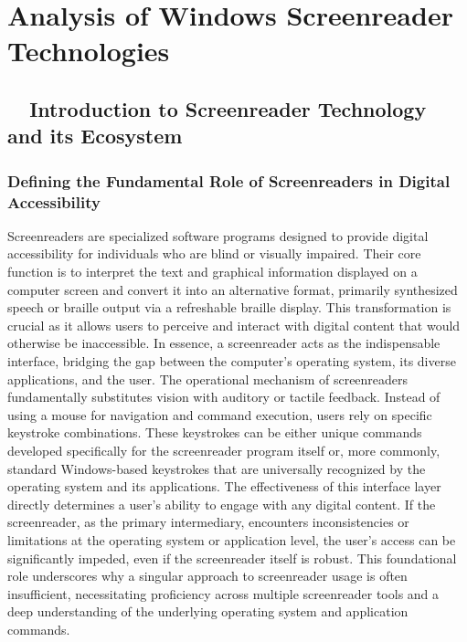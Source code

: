 \chapter{Analysis of Windows Screenreader Technologies}

\section{~~Introduction to Screenreader Technology and its Ecosystem}

\subsection{Defining the Fundamental Role of Screenreaders in Digital Accessibility}
Screenreaders are specialized software programs designed to provide digital accessibility for individuals who are blind or visually impaired. Their core function is to interpret the text and graphical information displayed on a computer screen and convert it into an alternative format, primarily synthesized speech or braille output via a refreshable braille display.\supercite{kingsbury2025} This transformation is crucial as it allows users to perceive and interact with digital content that would otherwise be inaccessible. In essence, a screenreader acts as the indispensable interface, bridging the gap between the computer's operating system, its diverse applications, and the user.\supercite{kingsbury2025}
The operational mechanism of screenreaders fundamentally substitutes vision with auditory or tactile feedback. Instead of using a mouse for navigation and command execution, users rely on specific keystroke combinations. These keystrokes can be either unique commands developed specifically for the screenreader program itself or, more commonly, standard Windows-based keystrokes that are universally recognized by the operating system and its applications.\supercite{kingsbury2025} The effectiveness of this interface layer directly determines a user's ability to engage with any digital content. If the screenreader, as the primary intermediary, encounters inconsistencies or limitations at the operating system or application level, the user's access can be significantly impeded, even if the screenreader itself is robust. This foundational role underscores why a singular approach to screenreader usage is often insufficient, necessitating proficiency across multiple screenreader tools and a deep understanding of the underlying operating system and application commands.

